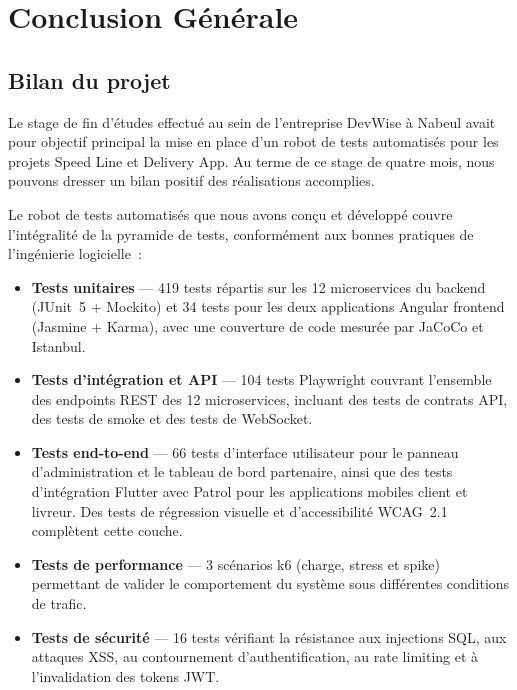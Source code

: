 \chapter*{Conclusion Générale}

\section*{Bilan du projet}

Le stage de fin d'études effectué au sein de l'entreprise DevWise à Nabeul avait
pour objectif principal la mise en place d'un robot de tests automatisés pour les
projets Speed Line et Delivery App. Au terme de ce stage de quatre mois, nous
pouvons dresser un bilan positif des réalisations accomplies.

Le robot de tests automatisés que nous avons conçu et développé couvre
l'intégralité de la pyramide de tests, conformément aux bonnes pratiques de
l'ingénierie logicielle~:

\begin{itemize}[leftmargin=2cm]
  \item \textbf{Tests unitaires} --- 419 tests répartis sur les 12 microservices
    du backend (JUnit~5 + Mockito) et 34 tests pour les deux applications
    Angular frontend (Jasmine + Karma), avec une couverture de code mesurée
    par JaCoCo et Istanbul.

  \item \textbf{Tests d'intégration et API} --- 104 tests Playwright couvrant
    l'ensemble des endpoints REST des 12 microservices, incluant des tests
    de contrats API, des tests de smoke et des tests de WebSocket.

  \item \textbf{Tests end-to-end} --- 66 tests d'interface utilisateur pour le
    panneau d'administration et le tableau de bord partenaire, ainsi que des
    tests d'intégration Flutter avec Patrol pour les applications mobiles
    client et livreur. Des tests de régression visuelle et d'accessibilité
    WCAG~2.1 complètent cette couche.

  \item \textbf{Tests de performance} --- 3 scénarios k6 (charge, stress et
    spike) permettant de valider le comportement du système sous différentes
    conditions de trafic.

  \item \textbf{Tests de sécurité} --- 16 tests vérifiant la résistance aux
    injections SQL, aux attaques XSS, au contournement d'authentification,
    au rate limiting et à l'invalidation des tokens JWT.
\end{itemize}

